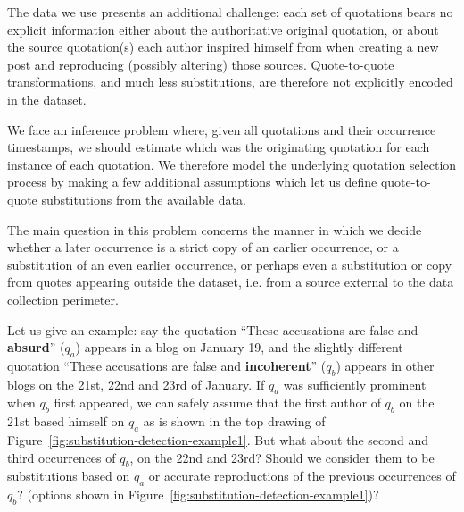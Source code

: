 The data we use presents an additional challenge: each set of quotations bears no explicit information either about the authoritative original quotation, or about the source quotation(s) each author inspired himself from when creating a new post and reproducing (possibly altering) those sources.
Quote-to-quote transformations, and much less substitutions, are therefore not explicitly encoded in the dataset.

We face an inference problem where, given all quotations and their occurrence timestamps, we should estimate which was the originating quotation for each instance of each quotation.
We therefore model the underlying quotation selection process by making a few additional assumptions which let us define quote-to-quote substitutions from the available data.

The main question in this problem concerns the manner in which we decide whether a later occurrence is a strict copy of an earlier occurrence, or a substitution of an even earlier occurrence, or perhaps even a substitution or copy from quotes appearing outside the dataset, \hbox{i.e.} from a source external to the data collection perimeter.

Let us give an example: say the quotation ``These accusations are false and \textbf{absurd}'' ($q_a$) appears in a blog on January 19, and the slightly different quotation ``These accusations are false and \textbf{incoherent}'' ($q_b$) appears in other blogs on the 21st, 22nd and 23rd of January.
If $q_a$ was sufficiently prominent when $q_b$ first appeared, we can safely assume that the first author of $q_b$ on the 21st based himself on $q_a$ as is shown in the top drawing of Figure~\ref{fig:substitution-detection-example1}.
But what about the second and third occurrences of $q_b$, on the 22nd and 23rd?
Should we consider them to be substitutions based on $q_a$ %
or accurate reproductions of the previous occurrences of $q_b$?  (options shown in Figure~\ref{fig:substitution-detection-example1})?

